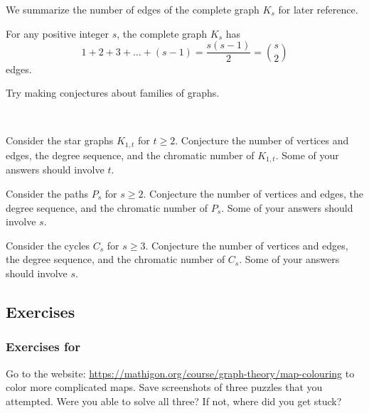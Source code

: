 We summarize the number of edges of the complete graph $K_s$ for later reference.

\begin{thm}
\label{thm_size_Ks}
    For any positive integer $s$, the complete graph $K_s$ has 
        $$1+2+3+\ldots+(s-1) = \frac{s(s-1)}{2} = \binom{s}{2}$$
    edges.
\end{thm}

Try making conjectures about families of graphs.

\begin{act}
\label{act_graph_conjectures}
~    
    \begin{actpart}
        \item Consider the star graphs $K_{1,t}$ for $t \ge 2$.  Conjecture the number of vertices and edges, the degree sequence, and the chromatic number of $K_{1,t}$. Some of your answers should involve $t$.  

        \item Consider the paths $P_s$ for $s \ge 2$. Conjecture the number of vertices and edges, the degree sequence, and the chromatic number of $P_s$. Some of your answers should involve $s$.

        \item Consider the cycles $C_s$ for $s \ge 3$. Conjecture the number of vertices and edges, the degree sequence, and the chromatic number of $C_s$. Some of your answers should involve $s$. 
    \end{actpart}
\end{act}


\subsection{Exercises}


\subsubsection*{Exercises for  \subcolormaps}

\begin{exer}[\exerP] %
\label{exer_map_coloring_website}
    Go to the website: \url{https://mathigon.org/course/graph-theory/map-colouring}
    to color more complicated maps.  Save screenshots of three puzzles that you attempted.  Were you able to solve all three?  If not, where did you get stuck?
\end{exer}

